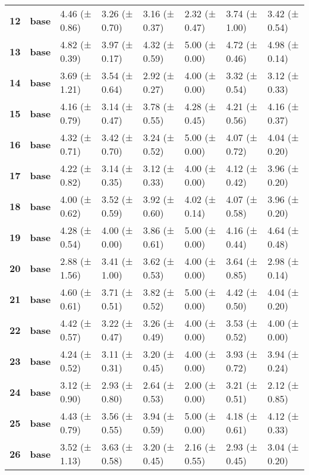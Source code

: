 \begin{longtable}{llllllll}
\cline{1-8}
\textbf{12} & \textbf{base} & 4.46 (± 0.86) & 3.26 (± 0.70) & 3.16 (± 0.37) & 2.32 (± 0.47) & 3.74 (± 1.00) & 3.42 (± 0.54) \\
\cline{1-8}
\textbf{13} & \textbf{base} & 4.82 (± 0.39) & 3.97 (± 0.17) & 4.32 (± 0.59) & 5.00 (± 0.00) & 4.72 (± 0.46) & 4.98 (± 0.14) \\
\cline{1-8}
\textbf{14} & \textbf{base} & 3.69 (± 1.21) & 3.54 (± 0.64) & 2.92 (± 0.27) & 4.00 (± 0.00) & 3.32 (± 0.54) & 3.12 (± 0.33) \\
\cline{1-8}
\textbf{15} & \textbf{base} & 4.16 (± 0.79) & 3.14 (± 0.47) & 3.78 (± 0.55) & 4.28 (± 0.45) & 4.21 (± 0.56) & 4.16 (± 0.37) \\
\cline{1-8}
\textbf{16} & \textbf{base} & 4.32 (± 0.71) & 3.42 (± 0.70) & 3.24 (± 0.52) & 5.00 (± 0.00) & 4.07 (± 0.72) & 4.04 (± 0.20) \\
\cline{1-8}
\textbf{17} & \textbf{base} & 4.22 (± 0.82) & 3.14 (± 0.35) & 3.12 (± 0.33) & 4.00 (± 0.00) & 4.12 (± 0.42) & 3.96 (± 0.20) \\
\cline{1-8}
\textbf{18} & \textbf{base} & 4.00 (± 0.62) & 3.52 (± 0.59) & 3.92 (± 0.60) & 4.02 (± 0.14) & 4.07 (± 0.58) & 3.96 (± 0.20) \\
\cline{1-8}
\textbf{19} & \textbf{base} & 4.28 (± 0.54) & 4.00 (± 0.00) & 3.86 (± 0.61) & 5.00 (± 0.00) & 4.16 (± 0.44) & 4.64 (± 0.48) \\
\cline{1-8}
\textbf{20} & \textbf{base} & 2.88 (± 1.56) & 3.41 (± 1.00) & 3.62 (± 0.53) & 4.00 (± 0.00) & 3.64 (± 0.85) & 2.98 (± 0.14) \\
\cline{1-8}
\textbf{21} & \textbf{base} & 4.60 (± 0.61) & 3.71 (± 0.51) & 3.82 (± 0.52) & 5.00 (± 0.00) & 4.42 (± 0.50) & 4.04 (± 0.20) \\
\cline{1-8}
\textbf{22} & \textbf{base} & 4.42 (± 0.57) & 3.22 (± 0.47) & 3.26 (± 0.49) & 4.00 (± 0.00) & 3.53 (± 0.52) & 4.00 (± 0.00) \\
\cline{1-8}
\textbf{23} & \textbf{base} & 4.24 (± 0.52) & 3.11 (± 0.31) & 3.20 (± 0.45) & 4.00 (± 0.00) & 3.93 (± 0.72) & 3.94 (± 0.24) \\
\cline{1-8}
\textbf{24} & \textbf{base} & 3.12 (± 0.90) & 2.93 (± 0.80) & 2.64 (± 0.53) & 2.00 (± 0.00) & 3.21 (± 0.51) & 2.12 (± 0.85) \\
\cline{1-8}
\textbf{25} & \textbf{base} & 4.43 (± 0.79) & 3.56 (± 0.55) & 3.94 (± 0.59) & 5.00 (± 0.00) & 4.18 (± 0.61) & 4.12 (± 0.33) \\
\cline{1-8}
\textbf{26} & \textbf{base} & 3.52 (± 1.13) & 3.63 (± 0.58) & 3.20 (± 0.45) & 2.16 (± 0.55) & 2.93 (± 0.45) & 3.04 (± 0.20) \\

\end{longtable}

